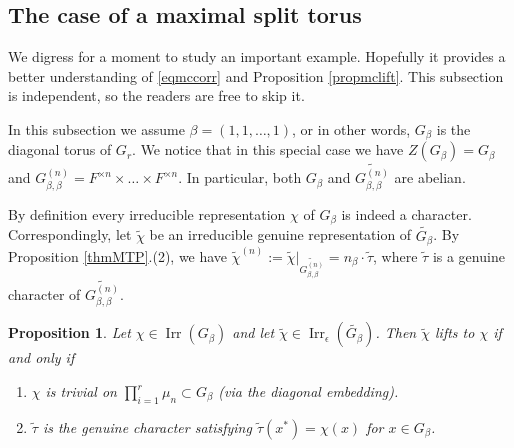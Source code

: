 \documentclass{amsart}
\numberwithin{equation}{section}
\newtheorem{proposition}[theorem]{\bf{Proposition}}
\newcommand{\rest}{\lvert}
\newcommand{\mrirr}{\operatorname{Irr}}
\newcommand{\wt}[1]{\widetilde{#1}}
\begin{document}
	\subsection{The case of a maximal split torus}
	
	We digress for a moment to study an important example. Hopefully it provides a better understanding of \eqref{eqmccorr} and Proposition \ref{propmclift}. This subsection is independent, so the readers are free to skip it.
	
	In this subsection we assume $\beta=(1,1,\dots,1)$, or in other words, $G_{\beta}$ is the diagonal torus of $G_{r}$. We notice that in this special case we have $Z(G_{\beta})=G_{\beta}$ and $G_{\beta,\beta}^{(n)}=F^{\times n}\times\dots\times F^{\times n}$. In particular, both $G_{\beta}$ and $\wt{G_{\beta,\beta}^{(n)}}$ are abelian.
	
	By definition every irreducible representation $\chi$ of $G_{\beta}$ is indeed a character. %
	Correspondingly, let $\wt{\chi}$ be an irreducible genuine representation of $\wt{G_{\beta}}$. By Proposition \ref{thmMTP}.(2), we have $\wt{\chi}^{(n)}:=\wt{\chi}\rest_{\wt{G_{\beta,\beta}^{(n)}}}=n_{\beta}\cdot \wt{\tau}$, where $\wt{\tau}$ is a genuine character of $\wt{G_{\beta,\beta}^{(n)}}$. 
	
	\begin{proposition}
		
		Let $\chi\in\mrirr(G_{\beta})$ and let $\wt{\chi}\in\mrirr_{\epsilon}(\wt{G_{\beta}})$. Then $\wt{\chi}$ lifts to $\chi$ if and only if \begin{enumerate}
			\item $\chi$ is trivial on $\prod_{i=1}^{r}\mu_{n}\subset G_{\beta}$ (via the diagonal embedding).
			\item  $\wt{\tau}$ is the genuine character satisfying $\wt{\tau}(x^{*})=\chi(x)$ for $x\in G_{\beta}$.
		\end{enumerate} 
		
	\end{proposition}
	
\end{document}
